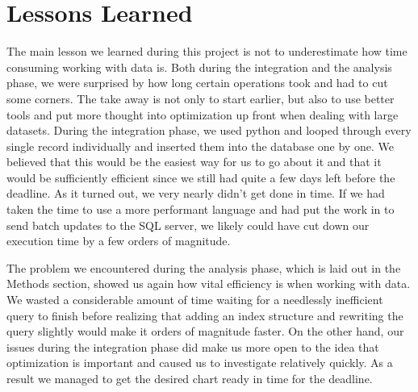 \section{Lessons Learned}
The main lesson we learned during this project is not to underestimate how time consuming working with data is.
Both during the integration and the analysis phase, we were surprised by how long certain operations took and had to cut some corners.
The take away is not only to start earlier, but also to use better tools and put more thought into optimization up front when dealing with large datasets.
During the integration phase, we used python and looped through every single record individually and inserted them into the database one by one.
We believed that this would be the easiest way for us to go about it and that it would be sufficiently efficient since we still had quite a few days left before the deadline.
As it turned out, we very nearly didn't get done in time. If we had taken the time to use a more performant language and had put the work in to send batch updates to the SQL server, we likely could have cut down our execution time by a few orders of magnitude.

The problem we encountered during the analysis phase, which is laid out in the Methods section, showed us again how vital efficiency is when working with data.
We wasted a considerable amount of time waiting for a needlessly inefficient query to finish before realizing that adding an index structure and rewriting the query slightly would make it orders of magnitude faster.
On the other hand, our issues during the integration phase did make us more open to the idea that optimization is important and caused us to investigate relatively quickly.
As a result we managed to get the desired chart ready in time for the deadline.


